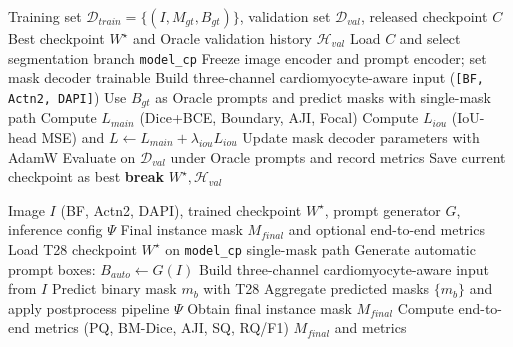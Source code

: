 \begin{algorithm}[t]
\caption{T28 Decoder-Focused Training and Oracle Evaluation}
\label{alg:t28_train_oracle}
\begin{algorithmic}[1]
\Require Training set $\mathcal{D}_{train}=\{(I,M_{gt},B_{gt})\}$, validation set $\mathcal{D}_{val}$, released checkpoint $C$
\Ensure Best checkpoint $W^\star$ and Oracle validation history $\mathcal{H}_{val}$
\State Load $C$ and select segmentation branch \texttt{model\_cp}
\State Freeze image encoder and prompt encoder; set mask decoder trainable
    \State Build three-channel cardiomyocyte-aware input (\texttt{[BF, Actn2, DAPI]})
    \State Use $B_{gt}$ as Oracle prompts and predict masks with single-mask path
    \State Compute $L_{main}$ (Dice+BCE, Boundary, AJI, Focal)
    \State Compute $L_{iou}$ (IoU-head MSE) and $L \gets L_{main} + \lambda_{iou} L_{iou}$
    \State Update mask decoder parameters with AdamW
  \EndFor
  \State Evaluate on $\mathcal{D}_{val}$ under Oracle prompts and record metrics
    \State Save current checkpoint as best
  \EndIf
    \State \textbf{break}
  \EndIf
\EndFor
\State \Return $W^\star, \mathcal{H}_{val}$
\end{algorithmic}
\end{algorithm}

\begin{algorithm}[t]
\caption{End-to-End Cardiomyocyte Instance Segmentation with Automatic Prompts}
\label{alg:e2e_prompt_seg}
\begin{algorithmic}[1]
\Require Image $I$ (BF, Actn2, DAPI), trained checkpoint $W^\star$, prompt generator $G$, inference config $\Psi$
\Ensure Final instance mask $M_{final}$ and optional end-to-end metrics
\State Load T28 checkpoint $W^\star$ on \texttt{model\_cp} single-mask path
\State Generate automatic prompt boxes: $B_{auto} \gets G(I)$
\State Build three-channel cardiomyocyte-aware input from $I$
  \State Predict binary mask $m_b$ with T28
\EndFor
\State Aggregate predicted masks $\{m_b\}$ and apply postprocess pipeline $\Psi$
\State Obtain final instance mask $M_{final}$
  \State Compute end-to-end metrics (PQ, BM-Dice, AJI, SQ, RQ/F1)
\EndIf
\State \Return $M_{final}$ and metrics
\end{algorithmic}
\end{algorithm}

